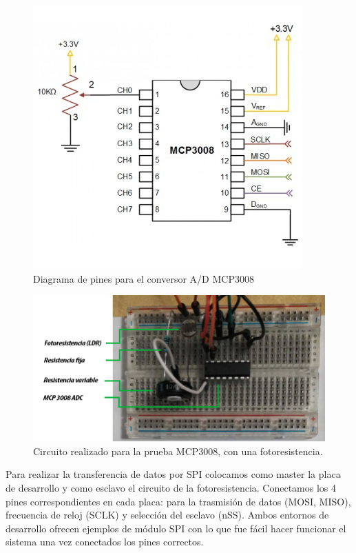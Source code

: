 \begin{figure}[h]%
	\centering
    \includegraphics[scale=0.5]{figures/mcp3008_esquema.PNG} %
    \caption[Diagrama de pines para el conversor A/D MCP3008]{Diagrama de pines para el conversor A/D MCP3008}
   	\label{figuraMCPEsquema}
\end{figure}

\begin{figure}[h]%
	\centering
    \includegraphics[scale=0.5]{figures/circuito_fotoresistencia.jpg} %
    \caption[Circuito realizado para la prueba MCP3008]{Circuito realizado para la prueba MCP3008, con una fotoresistencia.}
   	\label{figuraMCPEsquema}
\end{figure}

Para realizar la transferencia de datos por SPI colocamos como master la placa de desarrollo y como esclavo el circuito de la fotoresistencia. Conectamos los 4 pines correspondientes en cada placa: para la trasmisión de datos (MOSI, MISO), frecuencia de reloj (SCLK) y selección del esclavo (nSS). Ambos entornos de desarrollo ofrecen ejemplos de módulo SPI con lo que fue fácil hacer funcionar el sistema una vez conectados los pines correctos.

